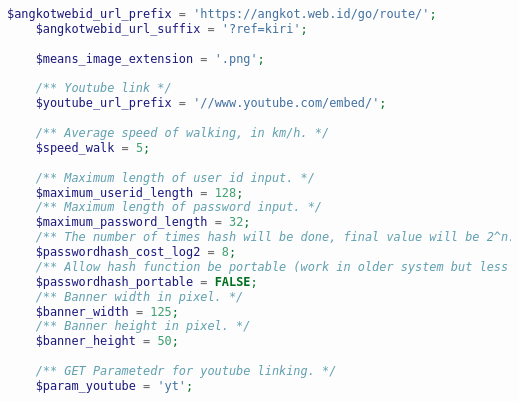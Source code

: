 \begin{lstlisting}[language=PHP,basicstyle=\tiny,caption=constants.php,label={lst:constants.php}]
	$angkotwebid_url_prefix = 'https://angkot.web.id/go/route/';
	$angkotwebid_url_suffix = '?ref=kiri';
	
	$means_image_extension = '.png';
	
	/** Youtube link */
	$youtube_url_prefix = '//www.youtube.com/embed/';
	
	/** Average speed of walking, in km/h. */
	$speed_walk = 5;
	
	/** Maximum length of user id input. */
	$maximum_userid_length = 128;
	/** Maximum length of password input. */
	$maximum_password_length = 32;	
	/** The number of times hash will be done, final value will be 2^n. */
	$passwordhash_cost_log2 = 8;
	/** Allow hash function be portable (work in older system but less secured. */
	$passwordhash_portable = FALSE;
	/** Banner width in pixel. */
	$banner_width = 125;
	/** Banner height in pixel. */
	$banner_height = 50;
	
	/** GET Parametedr for youtube linking. */
	$param_youtube = 'yt';
	

\end{lstlisting}
